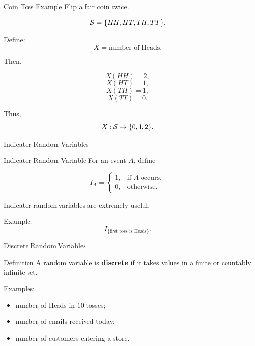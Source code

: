 \begin{frame}{Coin Toss Example}
Flip a fair coin twice.

\[
\mathcal{S}=\{HH,HT,TH,TT\}.
\]

Define:
\[
X=\text{number of Heads}.
\]

Then,

\[
X(HH)=2,
\]
\[
X(HT)=1,
\]
\[
X(TH)=1,
\]
\[
X(TT)=0.
\]

\vspace{0.25cm}

Thus,
\[
X:\mathcal{S}\to\{0,1,2\}.
\]
\end{frame}

\begin{frame}{Indicator Random Variables}
\begin{keybox}{Indicator Random Variable}
For an event $A$, define

\[
I_A=
\begin{cases}
1,&\text{if } A \text{ occurs},\\
0,&\text{otherwise}.
\end{cases}
\]
\end{keybox}

\vspace{0.25cm}

Indicator random variables are extremely useful.

\vspace{0.25cm}

Example.
\[
I_{\{\text{first toss is Heads}\}}.
\]
\end{frame}

\begin{frame}{Discrete Random Variables}
\begin{keybox}{Definition}
A random variable is \textbf{discrete} if it takes values in a finite or countably infinite set.
\end{keybox}

\vspace{0.25cm}

Examples:
\begin{itemize}
    \item number of Heads in $10$ tosses;
    \item number of emails received today;
    \item number of customers entering a store.
\end{itemize}

\vspace{0.25cm}

\end{frame}

